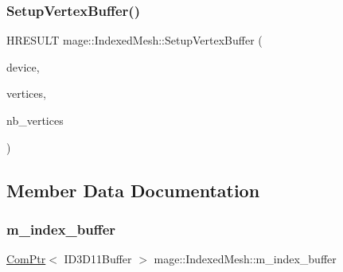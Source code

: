 \hypertarget{classmage_1_1_indexed_mesh_a6364a567e699a2afbeeb3324739cf003}{}\label{classmage_1_1_indexed_mesh_a6364a567e699a2afbeeb3324739cf003} 
\subsubsection{\texorpdfstring{Setup\+Vertex\+Buffer()}{SetupVertexBuffer()}}
{\footnotesize\ttfamily H\+R\+E\+S\+U\+LT mage\+::\+Indexed\+Mesh\+::\+Setup\+Vertex\+Buffer (\begin{DoxyParamCaption}\item[{\hyperlink{namespacemage_ae74f374780900893caa5555d1031fd79}{Com\+Ptr}$<$ I\+D3\+D11\+Device2 $>$}]{device,  }\item[{const \hyperlink{structmage_1_1_vertex}{Vertex} $\ast$}]{vertices,  }\item[{size\+\_\+t}]{nb\+\_\+vertices }\end{DoxyParamCaption})\hspace{0.3cm}{\ttfamily [protected]}}



\subsection{Member Data Documentation}
\hypertarget{classmage_1_1_indexed_mesh_ad8986e3f875a098c3b6d577dd53125e7}{}\label{classmage_1_1_indexed_mesh_ad8986e3f875a098c3b6d577dd53125e7} 
\subsubsection{\texorpdfstring{m\+\_\+index\+\_\+buffer}{m\_index\_buffer}}
{\footnotesize\ttfamily \hyperlink{namespacemage_ae74f374780900893caa5555d1031fd79}{Com\+Ptr}$<$ I\+D3\+D11\+Buffer $>$ mage\+::\+Indexed\+Mesh\+::m\+\_\+index\+\_\+buffer\hspace{0.3cm}{\ttfamily [protected]}}

\hypertarget{classmage_1_1_indexed_mesh_aa97d660f00cdec3c99b50ea636d49709}{}\label{classmage_1_1_indexed_mesh_aa97d660f00cdec3c99b50ea636d49709} 
